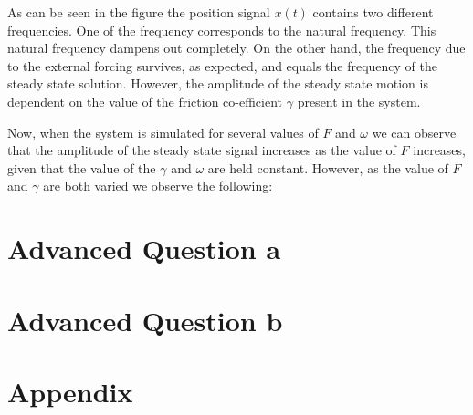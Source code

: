 \documentclass[10pt]{article}
\begin{document}
As can be seen in the figure the position signal $x(t)$ contains two different frequencies. One of the frequency corresponds to the natural frequency. This natural frequency dampens out completely. On the other hand, the frequency due to the external forcing survives, as expected, and equals the frequency of the steady state solution. However, the amplitude of the steady state motion is dependent on the value of the friction co-efficient $\gamma$ present in the system. 

Now, when the system is simulated for several values of $F$ and $\omega$ we can observe that the amplitude of the steady state signal increases as the value of $F$ increases, given that the value of the $\gamma$ and $\omega$ are held constant. However, as the value of $F$ and $\gamma$ are both varied we observe the following:

\begin{figure}
\centering


\end{figure}

\section*{Advanced Question a}

\begin{figure}[!htb]
\centering

\end{figure} 

\section*{Advanced Question b}

\section*{Appendix}
\end{document}
